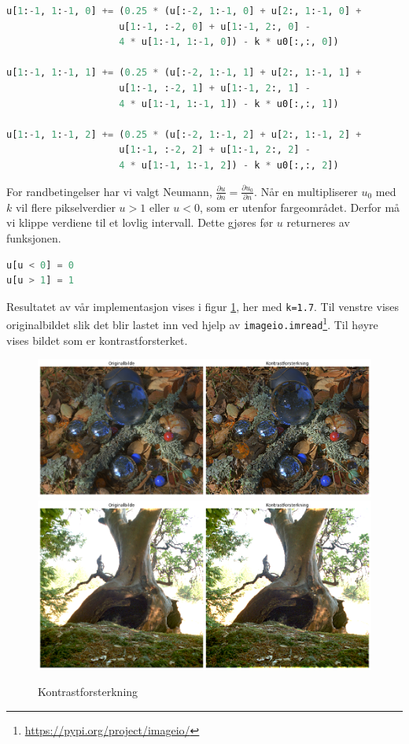 \begin{lstlisting}[language=Python]
u[1:-1, 1:-1, 0] += (0.25 * (u[:-2, 1:-1, 0] + u[2:, 1:-1, 0] + 
                    u[1:-1, :-2, 0] + u[1:-1, 2:, 0] - 
                    4 * u[1:-1, 1:-1, 0]) - k * u0[:,:, 0])
                    
u[1:-1, 1:-1, 1] += (0.25 * (u[:-2, 1:-1, 1] + u[2:, 1:-1, 1] + 
                    u[1:-1, :-2, 1] + u[1:-1, 2:, 1] - 
                    4 * u[1:-1, 1:-1, 1]) - k * u0[:,:, 1])
                    
u[1:-1, 1:-1, 2] += (0.25 * (u[:-2, 1:-1, 2] + u[2:, 1:-1, 2] + 
                    u[1:-1, :-2, 2] + u[1:-1, 2:, 2] - 
                    4 * u[1:-1, 1:-1, 2]) - k * u0[:,:, 2])
\end{lstlisting}
For randbetingelser har vi valgt Neumann, $\frac{\partial u}{\partial n}=\frac{\partial u_0}{\partial n}$. Når en multipliserer $u_0$ med $k$ vil flere pikselverdier $u > 1$ eller $u < 0$, som er utenfor fargeområdet. Derfor må vi klippe verdiene til et lovlig intervall. Dette gjøres før $u$ returneres av funksjonen.
\begin{lstlisting}[language=Python]
u[u < 0] = 0  
u[u > 1] = 1
\end{lstlisting}
Resultatet av vår implementasjon vises i figur \ref{fig:contrast1}, her med \texttt{k=1.7}. Til venstre vises originalbildet slik det blir lastet inn ved hjelp av \texttt{imageio.imread}\footnote{\url{https://pypi.org/project/imageio/}}. Til høyre vises bildet som er kontrastforsterket.
\begin{figure}[H]
\begin{center}
    \includegraphics[width=0.72\columnwidth]{bilder/Kontrastforsterkning/kontrast1.png}
     \includegraphics[width=0.72\columnwidth]{bilder/Kontrastforsterkning/kontrast2.png}
    \caption{Kontrastforsterkning \label{fig:contrast1}}
\end{center}
\end{figure}